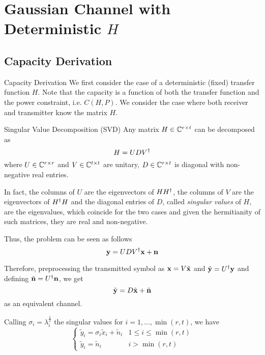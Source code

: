 \section{Gaussian Channel with Deterministic $H$}
\subsection{Capacity Derivation}

\begin{frame}[allowframebreaks]{Capacity Derivation}
We first consider the case of a deterministic (fixed) transfer function $H$. Note that the capacity is a function of both the transfer function and the power constraint, i.e. $C(H,P)$. We consider the case where both receiver and transmitter know the matrix $H$.

\begin{block}{Singular Value Decomposition (SVD)}
Any matrix $H\in \mathbb{C}^{r\times t}$ can be decomposed as
$$H = UDV^\dagger$$
where $U\in \mathbb{C}^{r\times r}$ and $V \in \mathbb{C}^{t\times t}$ are unitary, $D\in \mathbb{C}^{r\times t}$ is diagonal with non-negative real entries.

In fact, the columns of $U$ are the eigenvectors of $HH^\dagger$, the columns of $V$ are the eigenvectors of $H^\dagger H$ and the diagonal entries of $D$, called \textit{singular values} of $H$, are the eigenvalues, which coincide for the two cases and given the hermitianity of such matrices, they are real and non-negative.
\end{block}

\framebreak

Thus, the problem can be seen as follows
$$\vb{y} = UDV^\dagger\vb{x} + \vb{n}$$

Therefore, preprocessing the transmitted symbol as $\vb{x} = V\tilde{\vb{x}}$ and $\tilde{\vb{y}}=U^\dagger\vb{y}$ and defining $\tilde{\vb{n}} = U^\dagger\vb{n}$, we get
$$\tilde{\vb{y}} = D\tilde{\vb{x}} + \tilde{\vb{n}}$$
as an equivalent channel.

\myspace
Calling $\sigma_i = \lambda_i^{\frac{1}{2}}$ the singular values for $i=1,\ldots,\min(r,t)$, we have
\begin{equation*}
\begin{cases}
\tilde{y}_i = \sigma_i \tilde{x}_i + \tilde{n}_i & 1\leq i\leq \min(r,t)\\
\tilde{y}_i = \tilde{n}_i & i > \min(r,t)
\end{cases}
\end{equation*}

\end{frame}